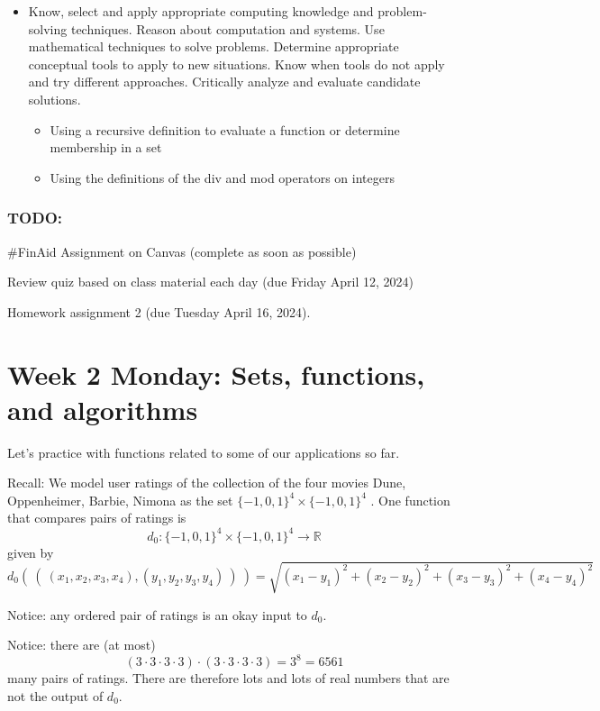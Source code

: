 \documentclass[12pt, oneside]{article}
\begin{document}
\begin{itemize}
\item Know, select and apply appropriate computing knowledge and problem-solving techniques. Reason about computation and systems. Use mathematical techniques to solve problems. Determine appropriate conceptual tools to apply to new situations. Know when tools do not apply and try different approaches. Critically analyze and evaluate candidate solutions.
\begin{itemize}
    \item Using a recursive definition to evaluate a function or determine membership in a set
    \item Using the definitions of the div and mod operators on integers
\end{itemize}

\end{itemize}

\subsubsection*{TODO:}
\begin{list}
   {\itemsep2pt}
   \item \#FinAid Assignment on Canvas (complete as soon as possible) 
   \item Review quiz based on class material each day (due Friday April 12, 2024)
   \item Homework assignment 2 (due Tuesday April 16, 2024).
\end{list}

\newpage

\section*{Week 2 Monday: Sets, functions, and algorithms}


Let's practice with functions related to some of our applications so far.

Recall: We model user ratings of the collection of the four movies Dune, Oppenheimer, Barbie, Nimona as the set
$\{-1,0,1\}^4 \times \{-1,0,1\}^4$ . One function that compares pairs of ratings is
$$d_0: \{-1,0,1\}^4 \times \{-1,0,1\}^4 \to \mathbb{R}$$
given by
\[
d_0 (~(~ (x_1, x_2, x_3, x_4), (y_1, y_2, y_3, y_4) ~) ~) = \sqrt{ (x_1 - y_1)^2 + (x_2 - y_2)^2 + (x_3 -y_3)^2 + (x_4 -y_4)^2}
\]

Notice: any ordered pair of ratings is an okay input to $d_0$.

Notice: there are (at most) 
\[
(3 \cdot 3 \cdot 3 \cdot 3)\cdot (3 \cdot 3 \cdot 3 \cdot 3) = 3^8 = 6561
\]
many pairs of ratings. There are therefore lots and lots of real numbers that are not the output of $d_0$.
\end{document}
